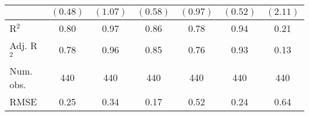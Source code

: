 \documentclass[fullpage]{paper}
\begin{document}
\begin{center}
\begin{longtable}{l c c c c c c }
            & $(0.48)$      & $(1.07)$       & $(0.58)$      & $(0.97)$       & $(0.52)$       & $(2.11)$      \\
\hline
R$^2$       & 0.80          & 0.97           & 0.86          & 0.78           & 0.94           & 0.21          \\
Adj. R$^2$  & 0.78          & 0.96           & 0.85          & 0.76           & 0.93           & 0.13          \\
Num. obs.   & 440           & 440            & 440           & 440            & 440            & 440           \\
RMSE        & 0.25          & 0.34           & 0.17          & 0.52           & 0.24           & 0.64          \\
\end{longtable}
\end{center}
\end{document}
